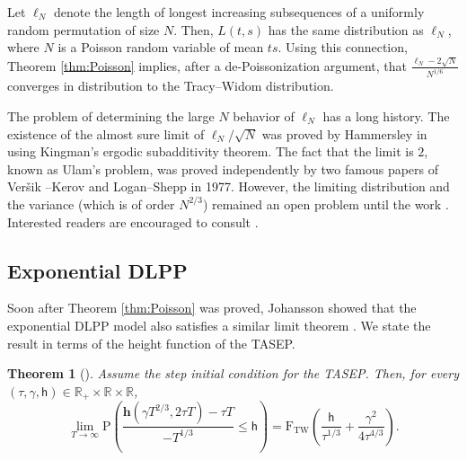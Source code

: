 \documentclass[10pt]{article}
\theoremstyle{plain}
\newtheorem{theorem}{Theorem}[section]
\theoremstyle{definition}
\newcommand{\beqq}{ \begin{equation*} }
\newcommand{\eeqq}{ \end{equation*} }
\newcommand{\R}{\mathbb{R}}
\newcommand{\Prob}{\mathrm{P}}    %
\newcommand{\kmath}{\mathsf}  %
\newcommand{\kt}{\tau} %
\newcommand{\kga}{\gamma} %
\newcommand{\kh}{\kmath{h}}  %
\newcommand{\kheight}{\mathbf{h}} %
\newcommand{\tap}{k}  %
\newcommand{\tat}{t}  %
\newcommand{\tah}{h}  %
\newcommand{\TW}{\mathrm{TW}}  %
\newcommand{\FTW}{\mathrm{F}_{\TW}}  %
\numberwithin{equation}{section}
\begin{document}
Let $\ell_N$ denote the length of longest increasing subsequences of a uniformly random permutation of size $N$. 
Then, $L(t,s)$ has the same distribution as $\ell_N$, where $N$ is a Poisson random variable of mean $ts$. 
Using this connection, Theorem \ref{thm:Poisson} implies, after a de-Poissonization argument, that 
$\frac{\ell_N- 2\sqrt{N}}{N^{1/6}}$ converges in distribution to the Tracy--Widom distribution. 


The problem of determining the large $N$ behavior of $\ell_N$ has a long history. The existence of the almost sure limit of $\ell_N/\sqrt{N}$ was proved by Hammersley in \cite{Hammersley72} using Kingman's ergodic subadditivity theorem. 
The fact that the limit is $2$, known as Ulam's problem, %
was proved independently by two famous papers of Ver\v{s}ik --Kerov \cite{Vershik-Kerov77} and Logan--Shepp \cite{Logan-Shepp77} in 1977. 
However, the limiting distribution and the variance (which is of order $N^{2/3}$) remained an open problem until the work \cite{Baik-Deift-Johansson99}. 
Interested readers are encouraged to consult \cite{Aldous-Diaconis99, Stanley07, Romik15, Baik-Deift-Suidan}.  


\subsection{Exponential DLPP}

Soon after Theorem \ref{thm:Poisson} was proved, Johansson showed that the exponential DLPP model also satisfies a similar limit theorem \cite{Johansson00}. 
We state the result in terms of the height function of the TASEP. 

\begin{theorem}[\cite{Johansson00}] \label{thm:Johansson}
Assume the step initial condition for the TASEP. 
Then, for every $( \kt, \kga, \kh) \in \R_+\times \R \times \R$, %
\beqq
	\lim_{T\to \infty} \Prob \left(  \frac{\kheight(\kga T^{2/3}, 2 \kt T) - \tau T}{-T^{1/3}} \le \kh \right) 
	=  \FTW \left( \frac{\kh}{\kt^{1/3}} + \frac{\kga^2}{4\kt^{4/3}} \right) . 
\eeqq
\end{theorem}
\end{document}
